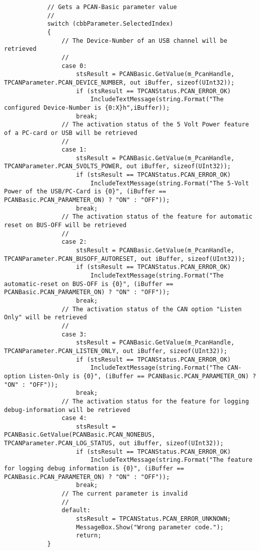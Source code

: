 \begin{lstlisting}
            // Gets a PCAN-Basic parameter value
            //
            switch (cbbParameter.SelectedIndex)
            {
                // The Device-Number of an USB channel will be retrieved
                //
                case 0:
                    stsResult = PCANBasic.GetValue(m_PcanHandle, TPCANParameter.PCAN_DEVICE_NUMBER, out iBuffer, sizeof(UInt32));
                    if (stsResult == TPCANStatus.PCAN_ERROR_OK)
                        IncludeTextMessage(string.Format("The configured Device-Number is {0:X}h",iBuffer));
                    break;
                // The activation status of the 5 Volt Power feature of a PC-card or USB will be retrieved
                //
                case 1:
                    stsResult = PCANBasic.GetValue(m_PcanHandle, TPCANParameter.PCAN_5VOLTS_POWER, out iBuffer, sizeof(UInt32));
                    if (stsResult == TPCANStatus.PCAN_ERROR_OK)
                        IncludeTextMessage(string.Format("The 5-Volt Power of the USB/PC-Card is {0}", (iBuffer == PCANBasic.PCAN_PARAMETER_ON) ? "ON" : "OFF"));
                    break;
                // The activation status of the feature for automatic reset on BUS-OFF will be retrieved
                //
                case 2:
                    stsResult = PCANBasic.GetValue(m_PcanHandle, TPCANParameter.PCAN_BUSOFF_AUTORESET, out iBuffer, sizeof(UInt32));
                    if (stsResult == TPCANStatus.PCAN_ERROR_OK)
                        IncludeTextMessage(string.Format("The automatic-reset on BUS-OFF is {0}", (iBuffer == PCANBasic.PCAN_PARAMETER_ON) ? "ON" : "OFF"));
                    break;
                // The activation status of the CAN option "Listen Only" will be retrieved
                //
                case 3:
                    stsResult = PCANBasic.GetValue(m_PcanHandle, TPCANParameter.PCAN_LISTEN_ONLY, out iBuffer, sizeof(UInt32));
                    if (stsResult == TPCANStatus.PCAN_ERROR_OK)
                        IncludeTextMessage(string.Format("The CAN-option Listen-Only is {0}", (iBuffer == PCANBasic.PCAN_PARAMETER_ON) ? "ON" : "OFF"));
                    break;
                // The activation status for the feature for logging debug-information will be retrieved
                case 4:
                    stsResult = PCANBasic.GetValue(PCANBasic.PCAN_NONEBUS, TPCANParameter.PCAN_LOG_STATUS, out iBuffer, sizeof(UInt32));
                    if (stsResult == TPCANStatus.PCAN_ERROR_OK)
                        IncludeTextMessage(string.Format("The feature for logging debug information is {0}", (iBuffer == PCANBasic.PCAN_PARAMETER_ON) ? "ON" : "OFF"));
                    break;
                // The current parameter is invalid
                //
                default:
                    stsResult = TPCANStatus.PCAN_ERROR_UNKNOWN;
                    MessageBox.Show("Wrong parameter code.");
                    return;
            }


\end{lstlisting}
